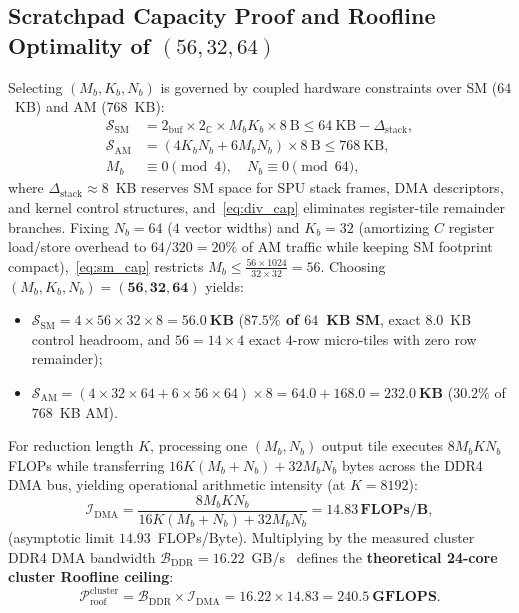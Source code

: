 \documentclass[journal]{IEEEtran}
\begin{document}
\subsection{Scratchpad Capacity Proof and Roofline Optimality of $(56, 32, 64)$}
Selecting $(M_b, K_b, N_b)$ is governed by coupled hardware constraints over SM ($64$~KB) and AM ($768$~KB):
\begin{subequations}
\begin{align}
\mathcal{S}_{\mathrm{SM}} &= 2_{\mathrm{buf}} \times 2_{\mathbb{C}} \times M_b K_b \times 8~\text{B} \le 64~\text{KB} - \Delta_{\mathrm{stack}}, \label{eq:sm_cap} \\
\mathcal{S}_{\mathrm{AM}} &= \left(4 K_b N_b + 6 M_b N_b\right) \times 8~\text{B} \le 768~\text{KB}, \label{eq:am_cap} \\
M_b &\equiv 0 \pmod 4, \quad N_b \equiv 0 \pmod{64}, \label{eq:div_cap}
\end{align}
\end{subequations}
where $\Delta_{\mathrm{stack}} \approx 8$~KB reserves SM space for SPU stack frames, DMA descriptors, and kernel control structures, and~\eqref{eq:div_cap} eliminates register-tile remainder branches. Fixing $N_b = 64$ ($4$ vector widths) and $K_b = 32$ (amortizing $C$ register load/store overhead to $64/320 = 20\%$ of AM traffic while keeping SM footprint compact),~\eqref{eq:sm_cap} restricts $M_b \le \frac{56 \times 1024}{32 \times 32} = 56$. Choosing $(M_b, K_b, N_b) = \mathbf{(56, 32, 64)}$ yields:
\begin{itemize}\setlength{\itemsep}{1pt}\setlength{\parskip}{0pt}
    \item $\mathcal{S}_{\mathrm{SM}} = 4 \times 56 \times 32 \times 8 = \mathbf{56.0~\text{KB}}$ (\textbf{$87.5\%$ of $64$~KB SM}, exact $8.0$~KB control headroom, and $56 = 14 \times 4$ exact $4$-row micro-tiles with zero row remainder);
    \item $\mathcal{S}_{\mathrm{AM}} = (4 \times 32 \times 64 + 6 \times 56 \times 64) \times 8 = 64.0 + 168.0 = \mathbf{232.0~\text{KB}}$ ($30.2\%$ of $768$~KB AM).
\end{itemize}

For reduction length $K$, processing one $(M_b, N_b)$ output tile executes $8 M_b K N_b$ FLOPs while transferring $16 K (M_b + N_b) + 32 M_b N_b$ bytes across the DDR4 DMA bus, yielding operational arithmetic intensity (at $K=8192$):
\begin{equation}
\mathcal{I}_{\mathrm{DMA}} = \frac{8 M_b K N_b}{16 K (M_b + N_b) + 32 M_b N_b} = \mathbf{14.83\,\text{FLOPs/B}},
\label{eq:ai_dma}
\end{equation}
(asymptotic limit $14.93$~FLOPs/Byte). Multiplying by the measured cluster DDR4 DMA bandwidth $\mathcal{B}_{\mathrm{DDR}} = 16.22$~GB/s~\cite{qi2025constraint} defines the \textbf{theoretical 24-core cluster Roofline ceiling}:
\begin{equation}
\mathcal{P}_{\mathrm{roof}}^{\mathrm{cluster}} = \mathcal{B}_{\mathrm{DDR}} \times \mathcal{I}_{\mathrm{DMA}} = 16.22 \times 14.83 = \mathbf{240.5~\text{GFLOPS}}.
\label{eq:cluster_roofline}
\end{equation}
\end{document}
